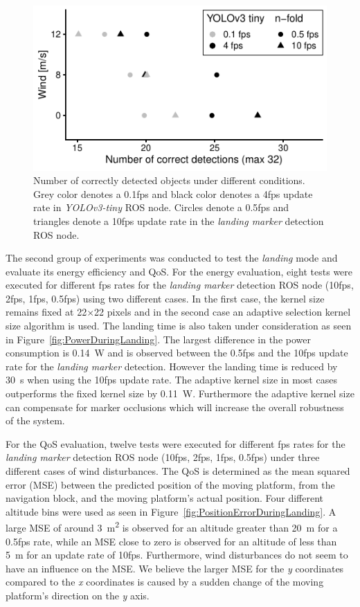 \documentclass[conference, onecolumn, draftclsnofoot]{IEEEtran}
\begin{document}
\begin{figure}[t]
\centering
\includegraphics{data_visualization/QoSDetection.pdf}
\caption{Number of correctly detected objects
under different conditions. 
Grey color denotes a 0.1fps and black color denotes a 4fps 
update rate in \emph{YOLOv3-tiny} ROS node. 
Circles denote a 0.5fps and triangles denote a 10fps update 
rate in the \emph{landing marker} detection ROS node.}
\label{fig:NCorrectObjectDetections}
\end{figure}


The second group of experiments was conducted to test the \emph{landing} mode
and evaluate its energy efficiency and QoS.
For the energy evaluation, eight tests were executed for different 
fps rates for the \emph{landing marker} detection ROS node 
(10fps, 2fps, 1fps, 0.5fps) using two different cases. 
In the first case, the kernel size remains fixed at 
22$\times$22 pixels and in the second case an adaptive selection 
kernel size algorithm is used. 
%
The landing time is also taken under consideration as seen in
Figure~\ref{fig:PowerDuringLanding}. The largest difference in the
power consumption is \SI{0.14}{\watt} and is observed between the 0.5fps and
the 10fps update rate for the \emph{landing marker} detection. However
the landing time is reduced by \SI{30}{\second} when using the 10fps update
rate. The adaptive kernel size in most cases outperforms the fixed
kernel size by \SI{0.11}{\watt}. Furthermore the adaptive kernel size can
compensate for marker occlusions which will increase the overall
robustness of the system.

For the QoS evaluation, twelve tests were executed for different 
fps rates for the \emph{landing marker} detection ROS node 
(10fps, 2fps, 1fps, 0.5fps) under three different cases of wind
disturbances. The QoS is determined as the  mean squared error (MSE) 
between the predicted position of the moving platform, 
from the navigation block, and the moving platform's actual position. 
Four different altitude bins were used as seen in 
Figure~\ref{fig:PositionErrorDuringLanding}. 
A large MSE of around \SI{3}{\square\meter} is observed for an altitude 
greater than \SI{20}{\meter} for a 0.5fps rate, while an MSE close to 
zero is observed for an altitude of less than \SI{5}{\meter} for an 
update rate of 10fps. Furthermore, wind disturbances do not seem to 
have an influence on the MSE. We believe the larger MSE for the \emph{y} 
coordinates compared to the \emph{x} coordinates is caused by a 
sudden change of the moving platform's direction on the \emph{y} axis.
\end{document}
